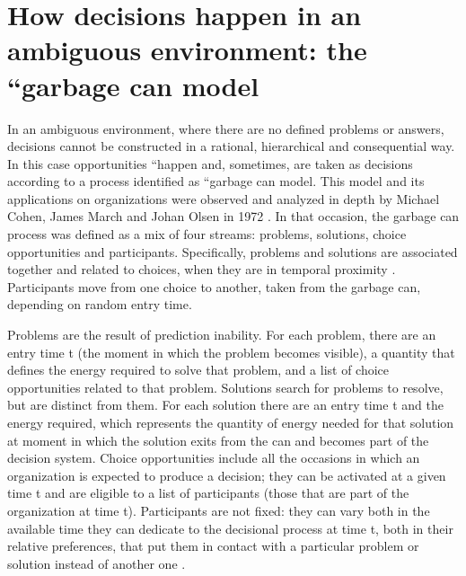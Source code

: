 \section{How decisions happen in an ambiguous environment: the ``garbage can model}

In an ambiguous environment, where there are no defined problems or answers, decisions cannot be constructed in a rational, hierarchical and consequential way. In this case opportunities ``happen and, sometimes, are taken as decisions according to a process identified as ``garbage can model\cite{1}\cite{2}. This model and its applications on organizations were observed and analyzed in depth by Michael Cohen, James March and Johan Olsen in 1972 \cite{1}. In that occasion, the garbage can process was defined as a mix of four streams: problems, solutions, choice opportunities and participants. Specifically, problems and solutions are associated together and related to choices, when they are in temporal proximity \cite{2}. Participants move from one choice to another, taken from the garbage can, depending on random entry time.

Problems are the result of prediction inability. For each problem, there are an entry time t (the moment in which the problem becomes visible), a quantity that defines the energy required to solve that problem, and a list of choice opportunities related to that problem. Solutions search for problems to resolve, but are distinct from them. For each solution there are an entry time t and the energy required, which represents the quantity of energy needed for that solution at moment in which the solution exits from the can and becomes part of the decision system. Choice opportunities include all the occasions in which an organization is expected to produce a decision; they  can be activated at a given time t and are eligible to a list of participants (those that are part of the organization at time t). Participants are not fixed: they can vary both in the available time they can dedicate to the decisional process at time t, both in their relative preferences, that put them in contact with a particular problem or solution instead of another one \cite{1}.


